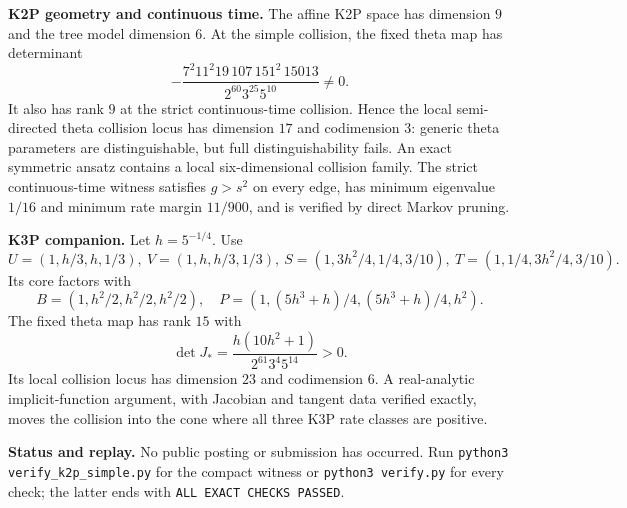 \documentclass[10pt]{article}
\begin{document}
\newpage
\textbf{K2P geometry and continuous time.} The affine K2P space has dimension $9$ and the tree model dimension $6$. At the simple collision, the fixed theta map has determinant
\[
-\frac{7^2 11^2 19\,107\,151^2\,15013}{2^{60}3^{25}5^{10}}\ne0.
\]
It also has rank $9$ at the strict continuous-time collision. Hence the local semi-directed theta collision locus has dimension $17$ and codimension $3$: generic theta parameters are distinguishable, but full distinguishability fails. An exact symmetric ansatz contains a local six-dimensional collision family. The strict continuous-time witness satisfies $g>s^2$ on every edge, has minimum eigenvalue $1/16$ and minimum rate margin $11/900$, and is verified by direct Markov pruning.

\textbf{K3P companion.} Let $h=5^{-1/4}$. Use
\[
U=(1,h/3,h,1/3),\ V=(1,h,h/3,1/3),\ S=(1,3h^2/4,1/4,3/10),\ T=(1,1/4,3h^2/4,3/10).
\]
Its core factors with
\[
B=(1,h^2/2,h^2/2,h^2/2),\quad P=(1,(5h^3+h)/4,(5h^3+h)/4,h^2).
\]
The fixed theta map has rank $15$ with
\[
\det J_*=\frac{h(10h^2+1)}{2^{61}3^4 5^{14}}>0.
\]
Its local collision locus has dimension $23$ and codimension $6$. A real-analytic implicit-function argument, with Jacobian and tangent data verified exactly, moves the collision into the cone where all three K3P rate classes are positive.

\textbf{Status and replay.} No public posting or submission has occurred. Run \texttt{python3 verify\_k2p\_simple.py} for the compact witness or \texttt{python3 verify.py} for every check; the latter ends with \texttt{ALL EXACT CHECKS PASSED}.
\end{document}
